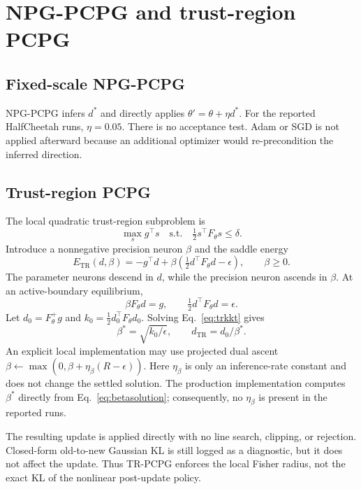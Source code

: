 \documentclass{article}
\newcommand{\Fpol}{F_{\theta}}
\begin{document}
\section{NPG-PCPG and trust-region PCPG}

\subsection{Fixed-scale NPG-PCPG}
NPG-PCPG infers $d^*$ and directly applies $\theta'=\theta+\eta d^*$. For the reported HalfCheetah runs, $\eta=0.05$. There is no acceptance test. Adam or SGD is not applied afterward because an additional optimizer would re-precondition the inferred direction.

\subsection{Trust-region PCPG}
The local quadratic trust-region subproblem is
\begin{equation}
\max_s g^\top s
\quad\text{s.t.}\quad
\tfrac12s^\top\Fpol s\leq\delta.
\label{eq:trproblem}
\end{equation}
Introduce a nonnegative precision neuron $\beta$ and the saddle energy
\begin{equation}
E_{\mathrm{TR}}(d,\beta)=-g^\top d
+\beta\left(\tfrac12d^\top\Fpol d-\epsilon\right),
\qquad \beta\geq0.
\label{eq:trenergy}
\end{equation}
The parameter neurons descend in $d$, while the precision neuron ascends in $\beta$. At an active-boundary equilibrium,
\begin{equation}
\beta\Fpol d=g,
\qquad
\tfrac12d^\top\Fpol d=\epsilon.
\label{eq:trkkt}
\end{equation}
Let $d_0=\Fpol^+g$ and $k_0=\frac12d_0^\top\Fpol d_0$. Solving Eq.~\eqref{eq:trkkt} gives
\begin{equation}
\beta^*=\sqrt{k_0/\epsilon},
\qquad
d_{\mathrm{TR}}=d_0/\beta^*.
\label{eq:betasolution}
\end{equation}
An explicit local implementation may use projected dual ascent
$\beta\leftarrow\max(0,\beta+\eta_\beta(R-\epsilon))$.
Here $\eta_\beta$ is only an inference-rate constant and does not change the settled solution. The production implementation computes $\beta^*$ directly from Eq.~\eqref{eq:betasolution}; consequently, no $\eta_\beta$ is present in the reported runs.

The resulting update is applied directly with no line search, clipping, or rejection. Closed-form old-to-new Gaussian KL is still logged as a diagnostic, but it does not affect the update. Thus TR-PCPG enforces the local Fisher radius, not the exact KL of the nonlinear post-update policy.
\end{document}
